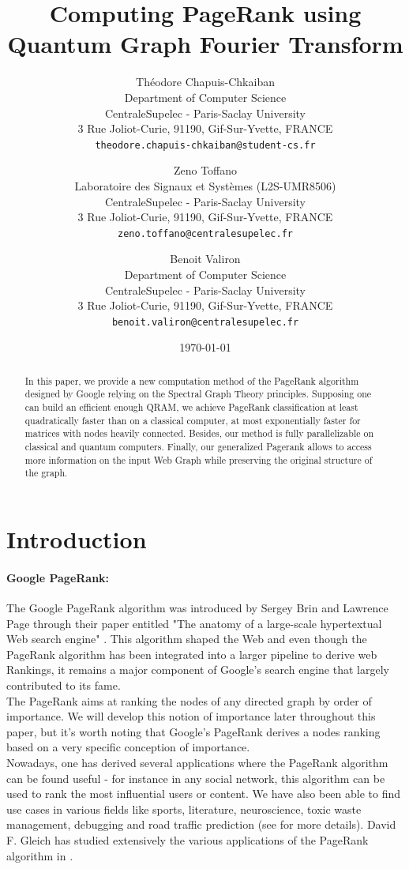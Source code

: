 \documentclass{article}
\title{Computing PageRank using Quantum Graph Fourier Transform}
\author{
  Théodore Chapuis-Chkaiban\\
  Department of Computer Science\\
  CentraleSupelec - Paris-Saclay University\\
  3 Rue Joliot-Curie, 91190, Gif-Sur-Yvette, FRANCE\\ 
  \texttt{theodore.chapuis-chkaiban@student-cs.fr}
\and
 Zeno Toffano \\
  Laboratoire des Signaux et Systèmes (L2S-UMR8506)\\
  CentraleSupelec - Paris-Saclay University\\
  3 Rue Joliot-Curie, 91190, Gif-Sur-Yvette, FRANCE\\
  \texttt{zeno.toffano@centralesupelec.fr}
  \and
  Benoit Valiron \\
  Department of Computer Science\\
  CentraleSupelec - Paris-Saclay University\\
  3 Rue Joliot-Curie, 91190, Gif-Sur-Yvette, FRANCE\\
  \texttt{benoit.valiron@centralesupelec.fr} 
}
\date{\today}
\begin{document}
\maketitle
 
\begin{abstract}
In this paper, we provide a new computation method of the PageRank algorithm designed by Google relying on the Spectral Graph Theory principles. Supposing one can build an efficient enough QRAM, we achieve PageRank classification at least quadratically faster than on a classical computer, at most exponentially faster for matrices with nodes heavily connected. Besides, our method is fully parallelizable on classical and quantum computers. Finally, our generalized Pagerank allows to access more information on the input Web Graph while preserving the original structure of the graph.
\end{abstract}




\section{Introduction}


\paragraph{Google PageRank:}
The Google PageRank algorithm was introduced by Sergey Brin and Lawrence Page through their paper entitled "The anatomy of a large-scale hypertextual Web search engine" \cite{brin_page_1998}. This algorithm shaped the Web and even though the PageRank algorithm has been integrated into a larger pipeline to derive web Rankings, it remains a major component of Google's search engine that largely contributed to its fame.\\
The PageRank aims at ranking the nodes of any directed graph by order of importance. We will develop this notion of importance later throughout this paper, but it's worth noting that Google's PageRank derives a nodes ranking based on a very specific conception of importance. \\
Nowadays, one has derived several applications where the PageRank algorithm can be found useful - for instance in any social network, this algorithm can be used to rank the most influential users or content. We have also been able to find use cases in various fields like sports, literature, neuroscience, toxic waste management, debugging and road traffic prediction (see \cite{cornell_pagerank} for more details). David F. Gleich has studied extensively the various applications of the PageRank algorithm in \cite{gleich_2015}.
\end{document}
